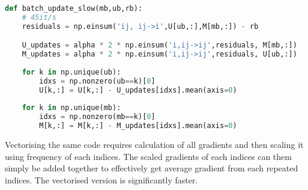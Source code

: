 \documentclass[12pt,crop=false,class=article,convert={density=300,outext=.compiled.png}]{standalone}
\begin{document}

\begin{lstlisting}[language=Python]
def batch_update_slow(mb,ub,rb):
    # 45it/s
    residuals = np.einsum('ij, ij->i',U[ub,:],M[mb,:]) - rb

    U_updates = alpha * 2 * np.einsum('i,ij->ij',residuals, M[mb,:])
    M_updates = alpha * 2 * np.einsum('i,ij->ij',residuals, U[ub,:])
    
    for k in np.unique(ub):
        idxs = np.nonzero(ub==k)[0]
        U[k,:] = U[k,:] - U_updates[idxs].mean(axis=0)
    
    for k in np.unique(mb):
        idxs = np.nonzero(mb==k)[0]
        M[k,:] = M[k,:] - M_updates[idxs].mean(axis=0)
\end{lstlisting}

Vectorising the same code requires calculation of all gradients and then scaling it using frequency of each indices. The scaled gradients of each indices can them simply be added together to effectively get average gradient from each repeated indices.  The vectorised version is significantly faster.
\end{document}
